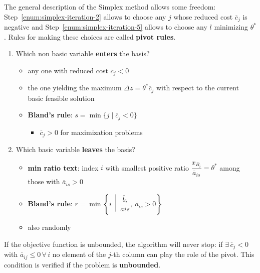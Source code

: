 \documentclass[english]{article}
\begin{document}
\bigskip
The general description of the Simplex method allows some freedom:
Step~\ref{enum:simplex-iteration-2} allows to choose any \(j\) whose reduced cost \(\overline{c}_j\) is negative and Step~\ref{enum:simplex-iteration-5} allows to choose any \(l\) minimizing \(\theta^\ast\).
Rules for making these choices are called \textbf{pivot rules}.

\begin{enumerate}
  \item Which non basic variable \textbf{enters} the basis?
        \begin{itemize}
          \item any one with reduced cost \(\overline{c}_j < 0\)
          \item the one yielding the maximum \(\Delta z = \theta^\ast \overline{c}_j\) with respect to the current basic feasible solution
          \item \textbf{Bland's rule}: \(s = \min \{ j \mid \overline{c}_j < 0 \}\)
                \begin{itemize}[label=\(\rightarrow\)]
                  \item \(\overline{c}_j > 0\) for maximization problems
                \end{itemize}
        \end{itemize}
  \item Which basic variable \textbf{leaves} the basis?
        \begin{itemize}
          \item \textbf{min ratio text}: index \(i\) with smallest positive ratio \(\dfrac{x_{B_i}}{\overline{a}_{is}} = \theta^\ast\) among those with \(\overline{a}_{is} > 0\)
          \item \textbf{Bland's rule}: \(r = \min \left\{ i \,\middle\vert\, \dfrac{\overline{b}_i}{\overline{a}{is}}, \ \overline{a}_{is} > 0 \right\}\)
          \item also randomly
        \end{itemize}
\end{enumerate}

\bigskip
\begin{property}[Unboundedness]
  If the objective function is unbounded, the algorithm will never stop: if \(\exists \, \overline{c}_j < 0\) with \(\overline{a}_{ij} \leq 0 \, \forall \, i\) no element of the \(j\)-th column can play the role of the pivot.
  This condition is verified if the problem is \textbf{unbounded}.
\end{property}
\end{document}
